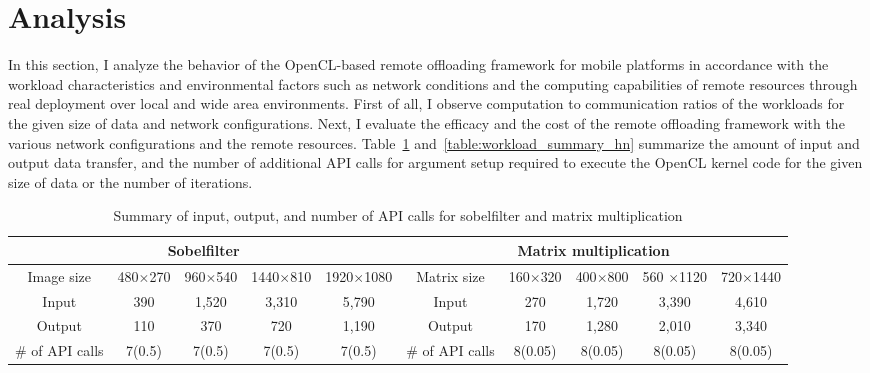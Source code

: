 \section{Analysis}
\label{character:analysis}
%
In this section, I analyze the behavior of the OpenCL-based remote
offloading framework for mobile platforms in accordance with the
workload characteristics and environmental factors such as network
conditions and the computing capabilities of remote resources through
real deployment over local and wide area environments.
%
First of all, I observe computation to communication ratios of the
workloads for the given size of data and network configurations.
%
Next, I evaluate the efficacy and the cost of the remote offloading
framework with the various network configurations and the remote
resources.
%
Table~\ref{table:workload_summary_sm} and~\ref{table:workload_summary_hn} 
summarize the amount of input and output data transfer, and the number
of additional API calls for argument setup required to execute the
OpenCL kernel code for the given size of data or the number of
iterations.
%
\begin{landscape}
\begin{table}
\centering
\caption{Summary of input, output, and number of API calls for
sobelfilter and matrix multiplication}
	\begin{tabular}{c|c|c|c|c|c|c|c|c|c}
	\hline
	 \multicolumn{5}{c|}{Sobelfilter} & \multicolumn{5}{c}{Matrix
multiplication} \\ \hline
	Image size & 480$\times$270 & 960$\times$540 & 1440$\times$810 &
1920$\times$1080 & Matrix size & 160$\times$320 & 400$\times$800 & 560
$\times$1120 & 720$\times$1440 \\
	Input & 390 & 1,520 & 3,310 & 5,790 & Input & 270 & 1,720 & 3,390 & 4,610 \\
	Output & 110 & 370 & 720 & 1,190 & Output & 170 & 1,280 & 2,010 & 3,340 \\
	\# of API calls & 7(0.5) & 7(0.5) & 7(0.5) & 7(0.5) & \# of API calls & 8(0.05) & 8(0.05) & 8(0.05) & 8(0.05) \\ \hline
\end{tabular}
\label{table:workload_summary_sm}
\end{table}
\end{landscape}
%
